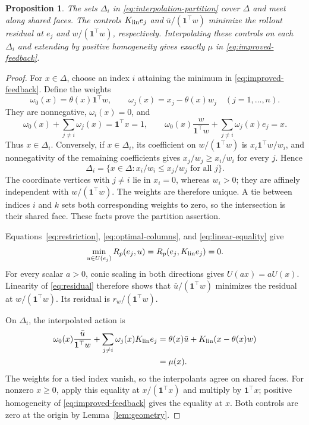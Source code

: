 \documentclass[10pt]{article}
\newtheorem{proposition}{Proposition}
\newcommand{\one}{\mathbf 1}
\begin{document}
\begin{proposition}
\label{prop:interpolation}
The sets $\Delta_i$ in \eqref{eq:interpolation-partition} cover $\Delta$ and meet along shared faces. The controls $K_{\rm lin}e_j$ and $\bar u/(\one^\top w)$ minimize the rollout residual at $e_j$ and $w/(\one^\top w)$, respectively. Interpolating these controls on each $\Delta_i$ and extending by positive homogeneity gives exactly $\mu$ in \eqref{eq:improved-feedback}.
\end{proposition}
\begin{proof}
For $x\in\Delta$, choose an index $i$ attaining the minimum in \eqref{eq:improved-feedback}. Define the weights
\begin{equation}
 \omega_0(x)=\theta(x)\one^\top w,\qquad
 \omega_j(x)=x_j-\theta(x)w_j\quad(j=1,\ldots,n).
 \label{eq:interpolation-weights}
\end{equation}
They are nonnegative, $\omega_i(x)=0$, and
\[
 \omega_0(x)+\sum_{j\ne i}\omega_j(x)=\one^\top x=1,\qquad
 \omega_0(x)\frac{w}{\one^\top w}
       +\sum_{j\ne i}\omega_j(x)e_j=x.
\]
Thus $x\in\Delta_i$. Conversely, if $x\in\Delta_i$, its coefficient on $w/(\one^\top w)$ is $x_i\one^\top w/w_i$, and nonnegativity of the remaining coefficients gives $x_j/w_j\ge x_i/w_i$ for every $j$. Hence
\[
 \Delta_i=\{x\in\Delta:x_i/w_i\le x_j/w_j\text{ for all }j\}.
\]
The coordinate vertices with $j\ne i$ lie in $x_i=0$, whereas $w_i>0$; they are affinely independent with $w/(\one^\top w)$. The weights are therefore unique. A tie between indices $i$ and $k$ sets both corresponding weights to zero, so the intersection is their shared face. These facts prove the partition assertion.

Equations~\eqref{eq:restriction}, \eqref{eq:optimal-columns}, and \eqref{eq:linear-equality} give
\[
 \min_{u\in U(e_j)}R_p(e_j,u)
 =R_p(e_j,K_{\rm lin}e_j)=0.
\]
For every scalar $a>0$, conic scaling in both directions gives $U(ax)=aU(x)$. Linearity of \eqref{eq:residual} therefore shows that $\bar u/(\one^\top w)$ minimizes the residual at $w/(\one^\top w)$. Its residual is $r_w/(\one^\top w)$.

On $\Delta_i$, the interpolated action is
\begin{align*}
 \omega_0(x)\frac{\bar u}{\one^\top w}
 +\sum_{j\ne i}\omega_j(x)K_{\rm lin}e_j
 &=\theta(x)\bar u+K_{\rm lin}(x-\theta(x)w)\\
 &=\mu(x).
\end{align*}
The weights for a tied index vanish, so the interpolants agree on shared faces. For nonzero $x\ge0$, apply this equality at $x/(\one^\top x)$ and multiply by $\one^\top x$; positive homogeneity of \eqref{eq:improved-feedback} gives the equality at $x$. Both controls are zero at the origin by Lemma~\ref{lem:geometry}.
\end{proof}
\end{document}
